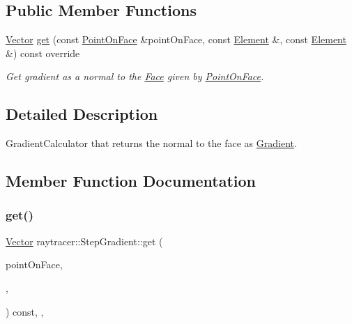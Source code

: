 \subsection*{Public Member Functions}
\begin{DoxyCompactItemize}
\item 
\hyperlink{classraytracer_1_1Vector}{Vector} \hyperlink{classraytracer_1_1StepGradient_a0c18f1abff911e8ebd91184b55c8c0ef}{get} (const \hyperlink{structraytracer_1_1PointOnFace}{Point\+On\+Face} \&point\+On\+Face, const \hyperlink{classraytracer_1_1Element}{Element} \&, const \hyperlink{classraytracer_1_1Element}{Element} \&) const override
\begin{DoxyCompactList}\small\item\em Get gradient as a normal to the \hyperlink{classraytracer_1_1Face}{Face} given by \hyperlink{structraytracer_1_1PointOnFace}{Point\+On\+Face}. \end{DoxyCompactList}\end{DoxyCompactItemize}


\subsection{Detailed Description}
Gradient\+Calculator that returns the normal to the face as \hyperlink{classraytracer_1_1Gradient}{Gradient}. 

\subsection{Member Function Documentation}
\mbox{\label{classraytracer_1_1StepGradient_a0c18f1abff911e8ebd91184b55c8c0ef}} 
\subsubsection{\texorpdfstring{get()}{get()}}
{\footnotesize\ttfamily \hyperlink{classraytracer_1_1Vector}{Vector} raytracer\+::\+Step\+Gradient\+::get (\begin{DoxyParamCaption}\item[{const \hyperlink{structraytracer_1_1PointOnFace}{Point\+On\+Face} \&}]{point\+On\+Face,  }\item[{const \hyperlink{classraytracer_1_1Element}{Element} \&}]{,  }\item[{const \hyperlink{classraytracer_1_1Element}{Element} \&}]{ }\end{DoxyParamCaption}) const\hspace{0.3cm}{\ttfamily [inline]}, {\ttfamily [override]}, {\ttfamily [virtual]}}



